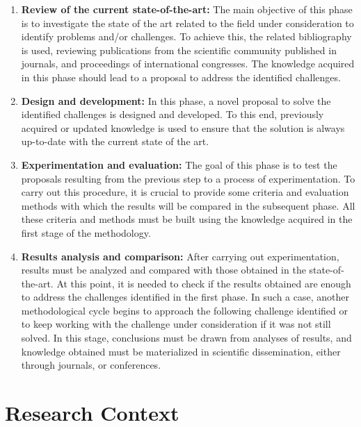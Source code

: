 \begin{enumerate}
    \item \textbf{Review of the current state-of-the-art:}  The main objective of this phase is to investigate the state of the art related to the field under consideration to identify problems and/or challenges. To achieve this, the related bibliography is used, reviewing publications from the scientific community published in journals, and proceedings of international congresses. The knowledge acquired in this phase should lead to a proposal to address the identified challenges.

 \item \textbf{Design and development:} In this phase, a novel proposal to solve the identified challenges is designed and developed. To this end, previously acquired or updated knowledge is used to ensure that the solution is always up-to-date with the current state of the art.

\item \textbf{Experimentation and evaluation:} The goal of this phase is to test the proposals resulting from the previous step to a process of experimentation. To carry out this procedure, it is crucial to provide some criteria and evaluation methods with which the results will be compared in the subsequent phase. All these criteria and methods must be built using the knowledge acquired in the first stage of the methodology.

\item \textbf{Results analysis and comparison:} After carrying out experimentation, results must be analyzed and compared with those obtained in the state-of-the-art. At this point, it is needed to check if the results obtained are enough to address the challenges identified in the first phase. In such a case, another methodological cycle begins to approach the following challenge identified or to keep working with the challenge under consideration if it was not still solved. In this stage, conclusions must be drawn from analyses of results, and knowledge obtained must be materialized in scientific dissemination, either
through journals, or conferences.

\end{enumerate}









\section{Research Context} \label{ch1:research-context}

